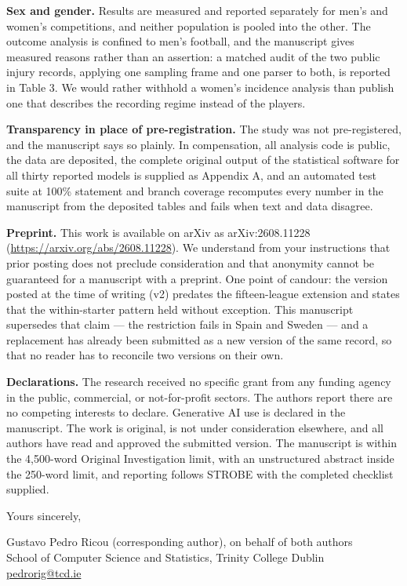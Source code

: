 \documentclass[11pt]{article}
\begin{document}
\textbf{Sex and gender.} Results are measured and reported separately for men's
and women's competitions, and neither population is pooled into the other. The
outcome analysis is confined to men's football, and the manuscript gives
measured reasons rather than an assertion: a matched audit of the two public
injury records, applying one sampling frame and one parser to both, is reported
in Table 3. We would rather withhold a women's incidence analysis than publish
one that describes the recording regime instead of the players.

\textbf{Transparency in place of pre-registration.} The study was not
pre-registered, and the manuscript says so plainly. In compensation, all
analysis code is public, the data are deposited, the complete original output
of the statistical software for all thirty reported models is supplied as
Appendix A, and an automated test suite at 100\% statement and branch coverage
recomputes every number in the manuscript from the deposited tables and fails
when text and data disagree.

\textbf{Preprint.} This work is available on arXiv as arXiv:2608.11228
(\url{https://arxiv.org/abs/2608.11228}). We understand from your instructions
that prior posting does not preclude consideration and that anonymity cannot be
guaranteed for a manuscript with a preprint. One point of candour: the version
posted at the time of writing (v2) predates the fifteen-league extension and
states that the within-starter pattern held without exception. This manuscript
supersedes that claim --- the restriction fails in Spain and Sweden --- and a
replacement has already been submitted as a new version of the same record,
so that no reader has to reconcile two versions on their own.

\textbf{Declarations.} The research received no specific grant from any funding
agency in the public, commercial, or not-for-profit sectors. The authors report
there are no competing interests to declare. Generative AI use is declared in
the manuscript. The work is original, is not under consideration elsewhere, and
all authors have read and approved the submitted version. The manuscript is
within the 4,500-word Original Investigation limit, with an unstructured
abstract inside the 250-word limit, and reporting follows STROBE with the
completed checklist supplied.

Yours sincerely,

Gustavo Pedro Ricou (corresponding author), on behalf of both authors\\
School of Computer Science and Statistics, Trinity College Dublin\\
\href{mailto:pedrorig@tcd.ie}{pedrorig@tcd.ie}
\end{document}
